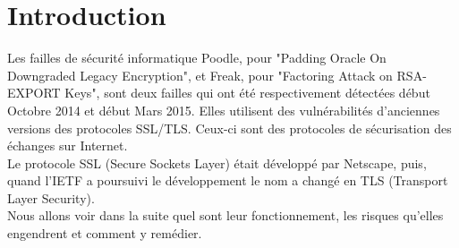 \section*{Introduction}

Les failles de sécurité informatique Poodle, pour "Padding Oracle On Downgraded Legacy Encryption", et Freak, pour "Factoring Attack on RSA-EXPORT Keys", sont deux failles qui ont été respectivement détectées début Octobre 2014 et début Mars 2015. Elles utilisent des vulnérabilités d'anciennes versions des protocoles SSL/TLS. Ceux-ci sont des protocoles de sécurisation des échanges sur Internet. \\ 
Le protocole SSL (Secure Sockets Layer) était développé par Netscape, puis, quand l'IETF a poursuivi le développement le nom a changé en TLS (Transport Layer Security). \\
Nous allons voir dans la suite quel sont leur fonctionnement, les risques qu'elles engendrent et comment y remédier. 
